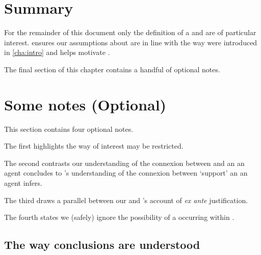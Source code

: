 \section*{Summary}


\begin{note}
  For the remainder of this document only the definition of a \wit{} and \supportII{} are of particular interest.
  \supportI{} ensures our assumptions about \fingfr{} are in line with the way  were introduced in \autoref{cha:intro} and helps motivate \supportII{}.
\end{note}


\begin{note}
  The final section of this chapter contains a handful of optional notes.
\end{note}


\section[Some notes]{Some notes \hfill (Optional)}


\begin{note}
  This section contains four optional notes.

  The first highlights the way  of interest may be restricted.

  The second contrasts our understanding of the connexion between  and an  an agent concludes to \citeauthor{Boghossian:2014aa}'s understanding of the connexion between `support' an  an agent infers.

  The third draws a parallel between our \supportII{} and \citeauthor{Goldman:1979ui}'s account of \emph{ex ante} justification.

  The fourth states we (safely) ignore the possibility of a \fingfr{} occurring within \fingfr{}.
\end{note}


\subsection*{The way conclusions are understood}


